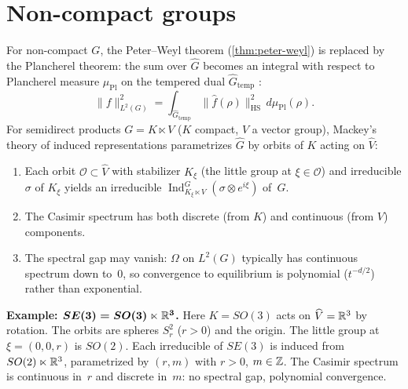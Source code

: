 \section{Non-compact groups}\label{sec:noncompact}

\begin{remark}
For non-compact $G$, the Peter--Weyl theorem (\cref{thm:peter-weyl}) is replaced by the Plancherel theorem: the sum over $\widehat{G}$ becomes an integral with respect to Plancherel measure $\mu_{\mathrm{Pl}}$ on the tempered dual $\widehat{G}_{\mathrm{temp}}$ \cite[Chapter~7]{Folland}:
\[
\|f\|_{L^2(G)}^2 = \int_{\widehat{G}_{\mathrm{temp}}} \|\widehat{f}(\rho)\|_{\mathrm{HS}}^2\, d\mu_{\mathrm{Pl}}(\rho).
\]
For semidirect products $G = K \ltimes V$ ($K$ compact, $V$ a vector group), Mackey's theory of induced representations \cite[Chapter~6]{Folland} parametrizes $\widehat{G}$ by orbits of $K$ acting on $\widehat{V}$:
\begin{enumerate}[label=(\roman*)]
\item Each orbit $\mathcal{O} \subset \widehat{V}$ with stabilizer $K_\xi$ (the little group at $\xi \in \mathcal{O}$) and irreducible $\sigma$ of $K_\xi$ yields an irreducible $\operatorname{Ind}_{K_\xi \ltimes V}^G(\sigma \otimes e^{i\xi})$ of~$G$.
\item The Casimir spectrum has both discrete (from $K$) and continuous (from $V$) components.
\item The spectral gap may vanish: $\Omega$ on $L^2(G)$ typically has continuous spectrum down to~$0$, so convergence to equilibrium is polynomial ($t^{-d/2}$) rather than exponential.
\end{enumerate}
\textbf{Example: $\boldsymbol{SE(3) = SO(3) \ltimes \mathbb{R}^3}$.} Here $K = SO(3)$ acts on $\widehat{V} = \mathbb{R}^3$ by rotation. The orbits are spheres $S^2_r$ ($r > 0$) and the origin. The little group at $\xi = (0,0,r)$ is $SO(2)$. Each irreducible of $SE(3)$ is induced from $SO(2) \ltimes \mathbb{R}^3$, parametrized by $(r, m)$ with $r > 0$, $m \in \mathbb{Z}$. The Casimir spectrum is continuous in~$r$ and discrete in~$m$: no spectral gap, polynomial convergence.
\end{remark}

